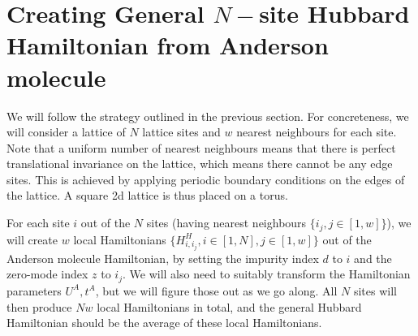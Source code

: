 \documentclass{article}
\numberwithin{equation}{section}
\begin{document}
\section{Creating General \(N-\)site Hubbard Hamiltonian from Anderson molecule}
We will follow the strategy outlined in the previous section. For concreteness, we will consider a lattice of \(N\) lattice sites and \(w\) nearest neighbours for each site. Note that a uniform number of nearest neighbours means that there is perfect translational invariance on the lattice, which means there cannot be any edge sites. This is achieved by applying periodic boundary conditions on the edges of the lattice. A square 2d lattice is thus placed on a torus.


For each site \(i\) out of the \(N\) sites (having nearest neighbours \(\{i_j, j\in\left[1,w\right]\}\)), we will create \(w\) local Hamiltonians \(\{H^H_{i,i_j}, i\in \left[1,N\right], j \in \left[1,w\right]  \}\) out of the Anderson molecule Hamiltonian, by setting the impurity index \(d\) to \(i\) and the zero-mode index \(z\) to \(i_j\). We will also need to suitably transform the Hamiltonian parameters \(U^A, t^A\), but we will figure those out as we go along. All \(N\) sites will then produce \(Nw\) local Hamiltonians in total, and the general Hubbard Hamiltonian should be the average of these local Hamiltonians. 
\end{document}
